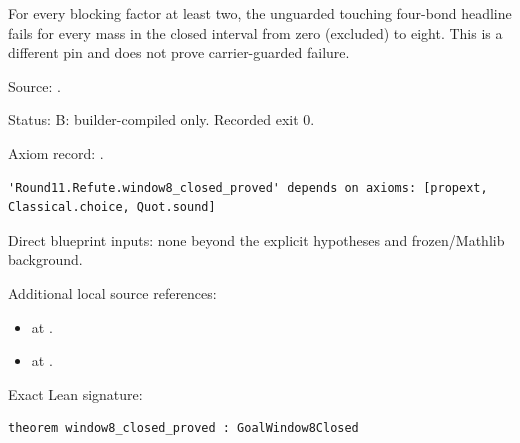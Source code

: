 \begin{theorem}[bp-235]
\label{bp-235}
\uses{}
\leanok
For every blocking factor at least two, the unguarded touching four-bond headline fails for every mass in the closed interval from zero (excluded) to eight. This is a different pin and does not prove carrier-guarded failure.

\par Source: \texttt{}.
\par Status: B: builder-compiled only. Recorded exit 0.
\par Axiom record: \texttt{}.
\begin{verbatim}
'Round11.Refute.window8_closed_proved' depends on axioms: [propext, Classical.choice, Quot.sound]
\end{verbatim}
\par Direct blueprint inputs: none beyond the explicit hypotheses and frozen/Mathlib background.
\par Additional local source references:
\begin{itemize}
\item \texttt{} at \texttt{}.
\item \texttt{} at \texttt{}.
\end{itemize}
\par Exact Lean signature:
\begin{verbatim}
theorem window8_closed_proved : GoalWindow8Closed
\end{verbatim}
\end{theorem}

